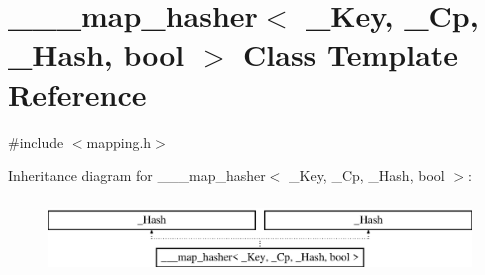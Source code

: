 \hypertarget{class______map__hasher}{}\section{\+\_\+\+\_\+\+\_\+map\+\_\+hasher$<$ \+\_\+\+Key, \+\_\+\+Cp, \+\_\+\+Hash, bool $>$ Class Template Reference}
\label{class______map__hasher}


{\ttfamily \#include $<$mapping.\+h$>$}

Inheritance diagram for \+\_\+\+\_\+\+\_\+map\+\_\+hasher$<$ \+\_\+\+Key, \+\_\+\+Cp, \+\_\+\+Hash, bool $>$\+:\begin{figure}[H]
\begin{center}
\leavevmode
\includegraphics[height=2.000000cm]{class______map__hasher}
\end{center}
\end{figure}
